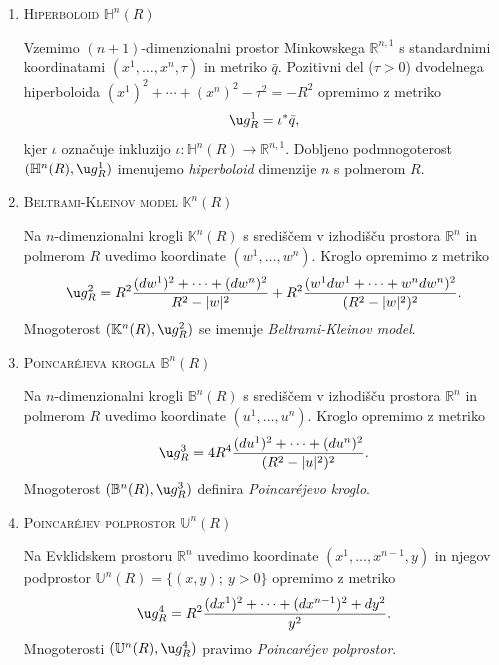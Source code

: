\documentclass[a4paper]{article}
\begin{document}
\begin{enumerate}
\item
\textsc{Hiperboloid} $\mathbb{H}^{n}(R)$

Vzemimo $(n+1)$-dimenzionalni prostor Minkowskega $\mathbb{R}^{n,1}$ s standardnimi koordinatami $(x^{1}, \dots , x^{n}, \tau)$ in metriko $\bar{q}$.
Pozitivni del ($\tau > 0$) dvodelnega hiperboloida $(x^{1})^2 + \cdots + (x^{n})^2 - \tau^2 = -R^2$ opremimo z metriko
\begin{equation}\label{eq:H^n metrika}
\u g_{R}^{1} = \iota^{*}\bar{q},
\end{equation}
kjer $\iota$ označuje inkluzijo $\iota \colon \mathbb{H}^{n}(R) \to \mathbb{R}^{n,1}$. Dobljeno podmnogoterost $(\mathbb{H}^{n}(R), \u g_{R}^{1})$ imenujemo \emph{hiperboloid} dimenzije $n$ s polmerom $R$.

\item
\textsc{Beltrami-Kleinov model} $\mathbb{K}^{n}(R)$

Na $n$-dimenzionalni krogli $\mathbb{K}^{n}(R)$ s središčem v izhodišču prostora $\mathbb{R}^{n}$ in polmerom $R$ uvedimo koordinate $(w^{1}, \dots , w^{n})$. Kroglo opremimo z metriko
\begin{equation}\label{eq:K^n metrika}
\u g_{R}^{2} = R^2 \frac{(dw^{1})^2 + \cdots + (dw^{n})^2}{R^2-|w|^2} + R^2 \frac{(w^{1}dw^{1} + \cdots + w^{n}dw^{n})^2}{(R^2-|w|^2)^2}.
\end{equation}
Mnogoterost $(\mathbb{K}^{n}(R), \u g_{R}^{2})$ se imenuje \emph{Beltrami-Kleinov model}.

\item
\textsc{Poincar\'ejeva krogla} $\mathbb{B}^{n}(R)$

Na $n$-dimenzionalni krogli $\mathbb{B}^{n}(R)$ s središčem v izhodišču prostora $\mathbb{R}^{n}$ in polmerom $R$ uvedimo koordinate $(u^{1}, \dots , u^{n})$. Kroglo opremimo z metriko
\begin{equation}\label{eq:K^n metrika}
\u g_{R}^{3} = 4R^4 \frac{(du^{1})^2 + \cdots + (du^{n})^2}{(R^2-|u|^2)^2}.
\end{equation}
Mnogoterost $(\mathbb{B}^{n}(R), \u g_{R}^{3})$ definira \emph{Poincar\'ejevo kroglo}.

\item
\textsc{Poincar\'ejev polprostor} $\mathbb{U}^{n}(R)$

Na Evklidskem prostoru $\mathbb{R}^{n}$ uvedimo koordinate $(x^{1}, \dots , x^{n-1}, y)$ in njegov podprostor $\mathbb{U}^{n}(R) = \{ (x,y); \ y>0 \}$ opremimo z metriko
\begin{equation}\label{eq:K^n metrika}
\u g_{R}^{4} = R^2 \frac{(dx^{1})^2 + \cdots + (dx^{n-1})^2 + dy^2}{y^2}.
\end{equation}
Mnogoterosti $(\mathbb{U}^{n}(R), \u g_{R}^{4})$ pravimo \emph{Poincar\'ejev polprostor}.
%
\end{enumerate}
\end{document}
